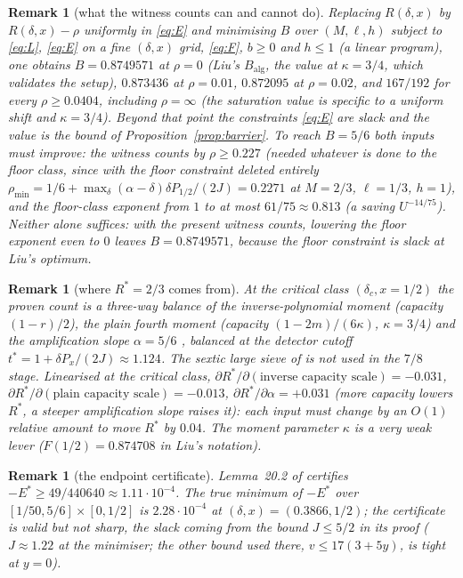 \documentclass[11pt]{article}
\newtheorem{remark}[proposition]{Remark}
\begin{document}
\begin{remark}[what the witness counts can and cannot do]
Replacing $R(\delta,x)$ by $R(\delta,x)-\rho$ uniformly in \eqref{eq:E} and minimising $B$ over $(M,\ell,h)$ subject to \eqref{eq:L}, \eqref{eq:E} on a fine $(\delta,x)$ grid, \eqref{eq:F}, $b\ge0$ and $h\le1$ (a linear program), one obtains $B=0.8749571$ at $\rho=0$ (Liu's $B_{\mathrm{alg}}$, the value at $\kappa=3/4$, which validates the setup), $0.873436$ at $\rho=0.01$, $0.872095$ at $\rho=0.02$, and $167/192$ for every $\rho\ge0.0404$, including $\rho=\infty$ (the saturation value is specific to a uniform shift and $\kappa=3/4$). Beyond that point the constraints \eqref{eq:E} are slack and the value is the bound of Proposition~\ref{prop:barrier}. To reach $B=5/6$ \emph{both} inputs must improve: the witness counts by $\rho\ge0.227$ (needed whatever is done to the floor class, since with the floor constraint deleted entirely $\rho_{\min}=1/6+\max_\delta(\alpha-\delta)\delta P_{1/2}/(2J)=0.2271$ at $M=2/3$, $\ell=1/3$, $h=1$), and the floor-class exponent from $1$ to at most $61/75\approx0.813$ (a saving $U^{-14/75}$). Neither alone suffices: with the present witness counts, lowering the floor exponent even to $0$ leaves $B=0.8749571$, because the floor constraint is slack at Liu's optimum.
\end{remark}

\begin{remark}[where $R^*=2/3$ comes from]
At the critical class $(\delta_c,x=1/2)$ the proven count is a three-way balance of the inverse-polynomial moment \cite[Lemma~17.1]{Ope26} (capacity $(1-r)/2$), the plain fourth moment \cite[Lemma~18.1]{Ope26} (capacity $(1-2m)/(6\kappa)$, $\kappa=3/4$) and the amplification slope $\alpha=5/6$ \cite[Lemma~17.6]{Ope26}, balanced at the detector cutoff $t^*=1+\delta P_x/(2J)\approx1.124$. The sextic large sieve of \cite[Lemma~9.1]{Ope26} is not used in the $7/8$ stage. Linearised at the critical class, $\partial R^*/\partial(\text{inverse capacity scale})=-0.031$, $\partial R^*/\partial(\text{plain capacity scale})=-0.013$, $\partial R^*/\partial\alpha=+0.031$ (more capacity lowers $R^*$, a steeper amplification slope raises it): each input must change by an $O(1)$ relative amount to move $R^*$ by $0.04$. The moment parameter $\kappa$ is a very weak lever ($F(1/2)=0.874708$ in Liu's notation).
\end{remark}

\begin{remark}[the endpoint certificate]
Lemma~20.2 of \cite{Ope26} certifies $-E^*\ge49/440640\approx1.11\cdot10^{-4}$. The true minimum of $-E^*$ over $[1/50,5/6]\times[0,1/2]$ is $2.28\cdot10^{-4}$ at $(\delta,x)=(0.3866,1/2)$; the certificate is valid but not sharp, the slack coming from the bound $J\le5/2$ in its proof ($J\approx1.22$ at the minimiser; the other bound used there, $v\le17(3+5y)$, is tight at $y=0$).
\end{remark}
\end{document}
